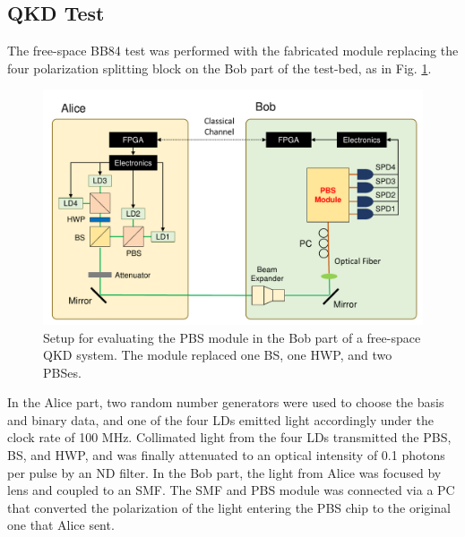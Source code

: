 \documentclass[letterpaper, 10pt]{article}
\begin{document}
\subsection{QKD Test}
The free-space BB84 test was performed with the fabricated module replacing the four polarization splitting block on the Bob part of the test-bed, as in Fig. \ref{fig:testbed}.
\begin{figure}
  \centering
  \includegraphics[width=13cm]{testbed.pdf}
  \caption{Setup for evaluating the PBS module in the Bob part of a free-space QKD system. The module replaced one BS, one HWP, and two PBSes. }
  \label{fig:testbed}
\end{figure}
In the Alice part, two random number generators were used to choose the basis and binary data, and one of the four LDs emitted light accordingly under the clock rate of 100 MHz.
Collimated light from the four LDs transmitted  the PBS, BS, and HWP, and was finally attenuated to an optical intensity of 0.1 photons per pulse by an ND filter.
In the Bob part, the light from Alice was  focused by lens and coupled to an SMF.
The SMF and PBS module was connected via a PC that converted the polarization of the light entering the PBS chip to the original one that Alice sent.
\end{document}
